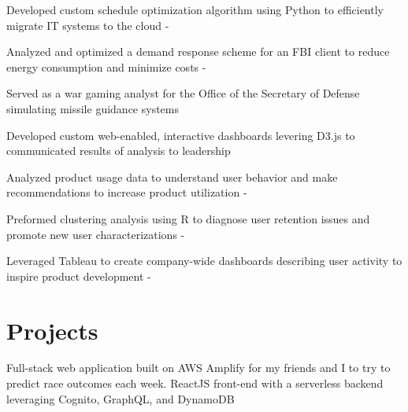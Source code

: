 \documentclass[]{plushcv}
\begin{document}
\begin{minipage}[t]{0.70\textwidth}
\begin{tightemize}
\sectionsep
\item Developed custom schedule optimization algorithm using Python to efficiently migrate IT systems to the cloud \python - \dthree\\
\item Analyzed and optimized a demand response scheme for an FBI client to reduce energy consumption and minimize costs \python - \dthree\\
\item Served as a war gaming analyst for the Office of the Secretary of Defense simulating missile guidance systems 
\item Developed custom web-enabled, interactive dashboards levering D3.js to communicated results of analysis to leadership \dthree\\
\end{tightemize}
\sectionsep

\begin{tightemize}
\sectionsep
\item Analyzed product usage data to understand user behavior and make recommendations to increase product utilization \Rlang - \mysql\\
\item Preformed clustering analysis using R to diagnose user retention issues and promote new user characterizations \Rlang - \mysql \\
\item Leveraged Tableau to create company-wide dashboards describing user activity to inspire product development \tableau - \mysql\\
\end{tightemize}
\sectionsep



\section{Projects}

\begin{tightemize}
\item Full-stack web application built on AWS Amplify for my friends and I to try to predict race outcomes each week. ReactJS front-end with a serverless backend leveraging Cognito, GraphQL, and DynamoDB \aws \\
\end{tightemize}
\sectionsep


\end{minipage}
\end{document}
